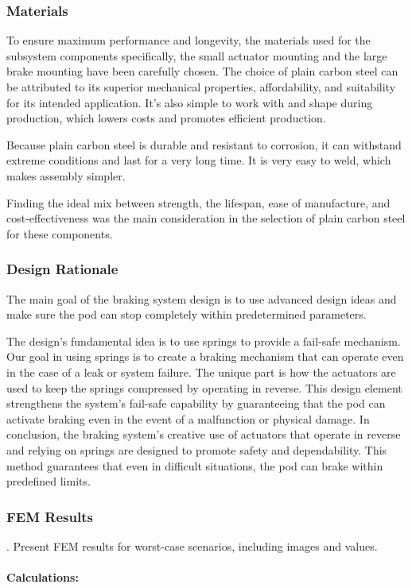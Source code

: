 \newpage
\subsubsection{Materials}
To ensure maximum performance and longevity, the materials used for the subsystem components specifically, the small actuator mounting and the large brake mounting have been carefully chosen.  The choice of plain carbon steel can be attributed to its superior mechanical properties, affordability, and suitability for its intended application. It's also simple to work with and shape during production, which lowers costs and promotes efficient production.


Because plain carbon steel is durable and resistant to corrosion, it can withstand extreme conditions and last for a very long time. It is very easy to weld, which makes assembly simpler.

Finding the ideal mix between strength, the lifespan, ease of manufacture, and cost-effectiveness was the main consideration in the selection of plain carbon steel for these components.

\subsubsection{Design Rationale}
The main goal of the braking system design is to use advanced design ideas and make sure the pod can stop completely within predetermined parameters.

The design's fundamental idea is to use springs to provide a fail-safe mechanism. Our goal in using springs is to create a braking mechanism that can operate even in the case of a leak or system failure. The unique part is how the actuators are used to keep the springs compressed by operating in reverse. This design element strengthens the system's fail-safe capability by guaranteeing that the pod can activate braking even in the event of a malfunction or physical damage.
In conclusion, the braking system's creative use of actuators that operate in reverse and relying on springs are designed to promote safety and dependability. This method guarantees that even in difficult situations, the pod can brake within predefined limits. 
\subsubsection{FEM Results}
.  Present FEM results for worst-case scenarios, including images and values.
\paragraph{\Large{Calculations:}}







